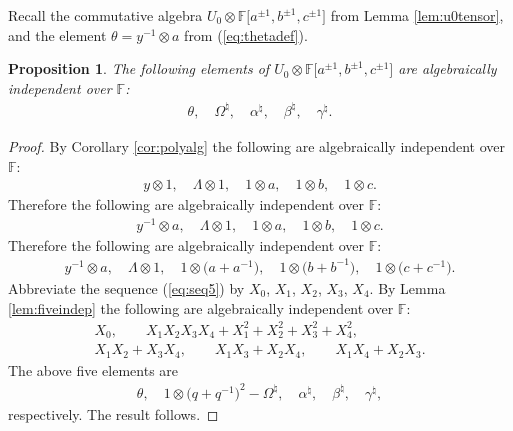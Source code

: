 \documentclass[pdftex]{sigma}
\numberwithin{equation}{section}
\newtheorem{Proposition}[Theorem]{Proposition}
{\theoremstyle{definition}
\newtheorem{Note}[Theorem]{Note}
\newtheorem{Definition}[Theorem]{Definition}
\newtheorem{Problem}[Theorem]{Problem}
}
\begin{document}
Recall the commutative algebra
$U_0\otimes
\mathbb F \lbrack a^{\pm 1}, b^{\pm 1}, c^{\pm 1}\rbrack $
from
Lemma \ref{lem:u0tensor}, and the element
$\theta = y^{-1}\otimes a$ from
(\ref{eq:thetadef}).


\begin{Proposition}
\label{lem:algind}
The following elements of
$U_0\otimes
\mathbb F \lbrack a^{\pm 1}, b^{\pm 1}, c^{\pm 1}\rbrack $
are algebraically independent over $\mathbb F$:
\begin{gather*}
\theta, \quad \Omega^\natural,
\quad
\alpha^\natural,
\quad
\beta^\natural,
\quad
\gamma^\natural.
\end{gather*}
\end{Proposition}
\begin{proof}
By
 Corollary
\ref{cor:polyalg} the following are algebraically independent over
$\mathbb F$:
\begin{gather*}
y \otimes 1, \quad
\Lambda \otimes 1,
\quad
1 \otimes a,
\quad
1 \otimes b,
\quad
1 \otimes c.
\end{gather*}
Therefore the following are
algebraically independent over
$\mathbb F$:
\begin{gather*}
y^{-1} \otimes a, \quad
\Lambda \otimes 1,
\quad
1 \otimes a,
\quad
1 \otimes b,
\quad
1 \otimes c.
\end{gather*}
Therefore the following are
algebraically independent over
$\mathbb F$:
\begin{gather}
y^{-1} \otimes a, \quad
\Lambda \otimes 1,
\quad
1 \otimes \big(a+a^{-1}\big),
\quad
1 \otimes \big(b+b^{-1}\big),
\quad
1 \otimes \big(c+c^{-1}\big).
\label{eq:seq5}
\end{gather}
Abbreviate the sequence
(\ref{eq:seq5})
by
$X_0$, $X_1$, $X_2$, $X_3$, $X_4$.
By
Lemma
\ref{lem:fiveindep}
the following are
algebraically independent over
$\mathbb F$:
\begin{gather*}
 X_0,
\qquad
X_1X_2X_3X_4
+X_1^2+X_2^2+X_3^2+X_4^2,
\\
 X_1X_2+X_3X_4,
\qquad
 X_1X_3+X_2X_4,
\qquad
 X_1X_4+X_2X_3.
\end{gather*}
The
above f\/ive elements are
\begin{gather*}
\theta,
 \quad
 1\otimes \big(q+q^{-1}\big)^2 -
 \Omega^\natural,
\quad
\alpha^\natural,
\quad
\beta^\natural,
\quad
\gamma^\natural,
\end{gather*}
respectively. The result follows.
\end{proof}
\end{document}
